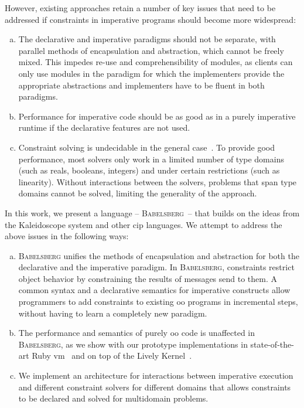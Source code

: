 \documentclass[english, inproceedings]{polze}
\newcommand{\ac}[1]{\gls{#1}}
\newcommand{\langname}{\textsc{Babelsberg}\xspace}
\begin{document}
However, existing approaches retain a number of key issues that need
to be addressed if constraints in imperative programs should become
more widespread:
\begin{enumerate}[a)]
\item The declarative and imperative paradigms should not be separate,
  with parallel methods of encapsulation and abstraction, which cannot
  be freely mixed. This impedes re-use and comprehensibility of
  modules, as clients can only use modules in the paradigm for which
  the implementers provide the appropriate abstractions and
  implementers have to be fluent in both paradigms.
\item Performance for imperative code should be as good as in a purely
  imperative runtime if the declarative features are not used.
\item Constraint solving is undecidable in the general
  case~\cite{marriott-stuckey-book}. To provide good performance, most
  solvers only work in a limited number of type domains (such as
  reals, booleans, integers) and under certain restrictions (such as
  linearity). Without interactions between the solvers, problems that
  span type domains cannot be solved, limiting the generality of the
  approach.
\end{enumerate}

In this work, we present a language -- \langname~-- that builds on the
ideas from the Kaleidoscope system and other \ac{cip} languages. We
attempt to address the above issues in the following ways:
\begin{enumerate}[a)]
\item \langname unifies the methods of encapsulation and abstraction
  for both the declarative and the imperative paradigm. In \langname,
  constraints restrict object behavior by constraining the results of
  messages send to them. A common syntax and a declarative semantics
  for imperative constructs allow programmers to add constraints to
  existing \ac{oo} programs in incremental steps, without having to
  learn a completely new paradigm.
\item The performance and semantics of purely \ac{oo} code is
  unaffected in \langname, as we show with our prototype
  implementations in state-of-the-art Ruby
  \ac{vm}~\cite{FelgentreffTopazWroclove2013} and on top of the Lively
  Kernel~\cite{lincke2012lively}.
\item We implement an architecture for interactions between imperative
  execution and different constraint solvers for different domains
  that allows constraints to be declared and solved for multidomain
  problems.
\end{enumerate}
\end{document}
